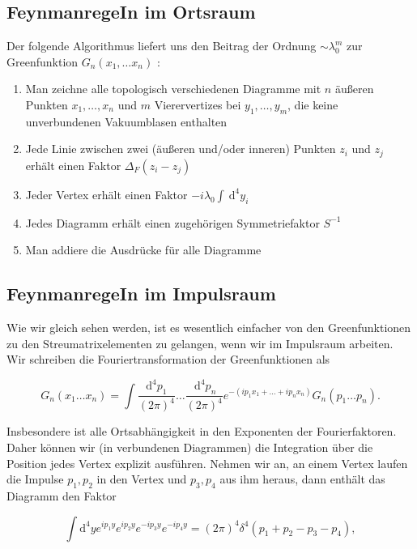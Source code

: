 \documentclass[10pt, letterpaper]{article}
\begin{document}
\subsection*{FeynmanregeIn im Ortsraum}
Der folgende Algorithmus liefert uns den Beitrag der Ordnung $\sim \lambda_{0}^{m}$ zur Greenfunktion $G_{n}\left(x_{1}, \ldots x_{n}\right)$ :

\begin{enumerate}
  \item Man zeichne alle topologisch verschiedenen Diagramme mit $n$ äußeren Punkten $x_{1}, \ldots, x_{n}$ und $m$ Vierervertizes bei $y_{1}, \ldots, y_{m}$, die keine unverbundenen Vakuumblasen enthalten
  \item Jede Linie zwischen zwei (äußeren und/oder inneren) Punkten $z_{i}$ und $z_{j}$ erhält einen Faktor $\Delta_{F}\left(z_{i}-z_{j}\right)$
  \item Jeder Vertex erhält einen Faktor $-i \lambda_{0} \int \mathrm{~d}^{4} y_{i}$
  \item Jedes Diagramm erhält einen zugehörigen Symmetriefaktor $S^{-1}$
  \item Man addiere die Ausdrücke für alle Diagramme
\end{enumerate}

\subsection*{FeynmanregeIn im Impulsraum}
Wie wir gleich sehen werden, ist es wesentlich einfacher von den Greenfunktionen zu den Streumatrixelementen zu gelangen, wenn wir im Impulsraum arbeiten. Wir schreiben die Fouriertransformation der Greenfunktionen als

$$
G_{n}\left(x_{1} \ldots x_{n}\right)=\int \frac{\mathrm{d}^{4} p_{1}}{(2 \pi)^{4}} \ldots \frac{\mathrm{~d}^{4} p_{n}}{(2 \pi)^{4}} e^{-\left(i p_{1} x_{1}+\ldots+i p_{n} x_{n}\right)} G_{n}\left(p_{1} \ldots p_{n}\right) .
$$

Insbesondere ist alle Ortsabhängigkeit in den Exponenten der Fourierfaktoren. Daher können wir (in verbundenen Diagrammen) die Integration über die Position jedes Vertex explizit ausführen. Nehmen wir an, an einem Vertex laufen die Impulse $p_{1}, p_{2}$ in den Vertex und $p_{3}, p_{4}$ aus ihm heraus, dann enthält das Diagramm den Faktor

$$
\int \mathrm{d}^{4} y e^{i p_{1} y} e^{i p_{2} y} e^{-i p_{3} y} e^{-i p_{4} y}=(2 \pi)^{4} \delta^{4}\left(p_{1}+p_{2}-p_{3}-p_{4}\right),
$$
\end{document}

